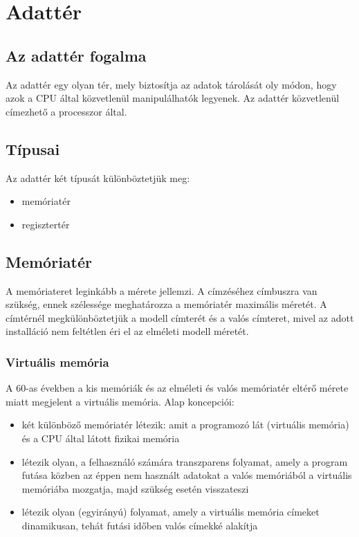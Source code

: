 
\chapter{Adattér}

\section{Az adattér fogalma}
Az adattér egy olyan tér, mely biztosítja az adatok tárolását oly módon, hogy azok a CPU által közvetlenül manipulálhatók legyenek.
Az adattér közvetlenül címezhető a processzor által.

\section{Típusai}
Az adattér két típusát különböztetjük meg:
\begin{itemize}
    \item memóriatér
    \item regisztertér
\end{itemize}

\section{Memóriatér}
A memóriateret leginkább a mérete jellemzi.
A címzéséhez címbuszra van szükség, ennek szélessége meghatározza a memóriatér maximális méretét.
A címtérnél megkülönböztetjük a modell címterét és a valós címteret, mivel az adott installáció nem feltétlen éri el az elméleti modell méretét.

\subsection{Virtuális memória}
A 60-as években a kis memóriák és az elméleti és valós memóriatér eltérő mérete miatt megjelent a virtuális memória.
Alap koncepciói:
\begin{itemize}
    \item két különböző memóriatér létezik: amit a programozó lát (virtuális memória) és a CPU által látott fizikai memória
    \item létezik olyan, a felhasználó számára transzparens folyamat, amely a program futása közben az éppen nem használt adatokat a valós memóriából a virtuális memóriába mozgatja, majd szükség esetén visszateszi
    \item létezik olyan (egyirányú) folyamat, amely a virtuális memória címeket dinamikusan, tehát futási időben valós címekké alakítja
\end{itemize}

